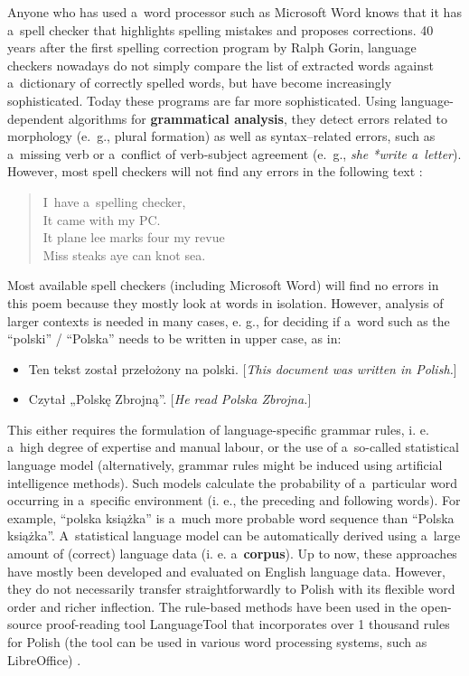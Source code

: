 \begin{multicols}{2}
Anyone who has used a~word processor such as Microsoft Word knows that
it has a~spell checker that highlights spelling mistakes and proposes
corrections. 40 years after the first spelling correction program by
Ralph Gorin, language checkers nowadays do not simply compare the list
of extracted words against a~dictionary of correctly spelled words,
but have become increasingly sophisticated. Today these programs are
far more sophisticated. Using language-dependent algorithms for
\textbf{grammatical analysis}, they detect errors related to
morphology (e.\, g., plural formation) as well as syntax--related
errors, such as a~missing verb or a~conflict of verb-subject agreement
(e.\, g., \textit{she *write a~letter}). However, most spell checkers
will not find any errors in the following text \cite{zar1}: 

\begin{verse} I~have a~spelling checker,\\
It came with my PC.\\
It plane lee marks four my revue\\
Miss steaks aye can knot sea. \end{verse} 

Most available spell checkers (including Microsoft Word) will find no
errors in this poem because they mostly look at words in isolation.
However, analysis of larger contexts is needed in many cases, e. g.,
for deciding if a~word such as the “polski” / “Polska” needs
to be written in upper case, as in: 

\begin{itemize} \item Ten tekst został przełożony na polski.
[\textit{This document was written in Polish.}] \item Czytał
„Polskę Zbrojną”. [\textit{He read Polska Zbrojna.}]
\end{itemize} 

This either requires the formulation of language-specific grammar
rules, i. e. a~high degree of expertise and manual labour, or the use
of a~so-called statistical language model (alternatively, grammar
rules might be induced using artificial intelligence methods). Such
models calculate the probability of a~particular word occurring in
a~specific environment (i. e., the preceding and following words). For
example, “polska książka” is a~much more probable word sequence
than “Polska książka”. A~statistical language model can be
automatically derived using a~large amount of (correct) language data
(i. e. a~\textbf{corpus}). Up to now, these approaches have mostly
been developed and evaluated on English language data. However, they
do not necessarily transfer straightforwardly to Polish with its
flexible word order and richer inflection. The rule-based methods have
been used in the open-source proof-reading tool LanguageTool that
incorporates over 1 thousand rules for Polish (the tool can be used in
various word processing systems, such as LibreOffice) \cite{lto1,
Mikowski2010}. 


\end{multicols}
